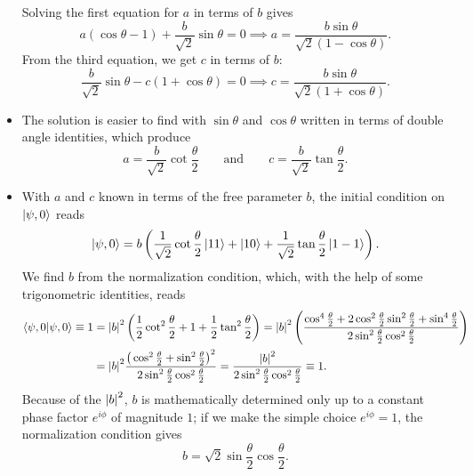 \documentclass[11pt, a4paper]{article}
\newcommand{\eqtext}[1]{\qquad \text{#1} \qquad}
\begin{document}
\begin{itemize}
	Solving the first equation for $ a $ in terms of $ b $ gives
	\begin{equation*}
		a(\cos \theta - 1) + \frac{b}{\sqrt{2}} \sin \theta = 0 \implies a = \frac{b\sin \theta}{\sqrt{2}(1 - \cos \theta)}.
	\end{equation*}
	From the third equation, we get $ c $ in terms of $ b $:
	\begin{equation*}
		\frac{b}{\sqrt{2}}\sin \theta - c(1 + \cos \theta) = 0 \implies c = \frac{b\sin \theta}{\sqrt{2}(1 + \cos \theta)}.
	\end{equation*}
	
	\item The solution is easier to find with $ \sin \theta  $ and $ \cos \theta $ written in terms of double angle identities, which produce
	\begin{equation*}
		 a = \frac{b}{\sqrt{2}
		 }\cot \frac{\theta}{2} \eqtext{and}  c = \frac{b}{\sqrt{2}}\tan \frac{\theta}{2}.
	\end{equation*}
	
	\item With $ a $ and $ c $ known in terms of the free parameter $ b $, the initial condition on $ \ket{\psi, 0} $ reads
	\begin{equation*}
		\ket{\psi, 0} = b\left(\frac{1}{\sqrt{2}}\cot \frac{\theta}{2}\ket{11} + \ket{10} + \frac{1}{\sqrt{2}}\tan \frac{\theta}{2}\ket{1-1}  \right).
	\end{equation*}
	We find $ b $ from the normalization condition, which, with the help of some trigonometric identities, reads
	\begin{align*}
		\braket{\psi, 0}{\psi, 0} \equiv 1 &= \abs{b}^{2}\left(\frac{1}{2}\cot^{2}\frac{\theta}{2} + 1 + \frac{1}{2}\tan^{2}\frac{\theta}{2} \right) = \abs{b}^{2}\left(\frac{\cos^{4}\frac{\theta}{2} + 2 \cos^{2}\frac{\theta}{2}\sin^{2}\frac{\theta}{2} + \sin^{4}\frac{\theta}{2}}{2\sin^{2}\frac{\theta}{2}\cos^{2}\frac{\theta}{2}}\right)\\
		&=\abs{b}^{2}\frac{\big(\cos^{2}\frac{\theta}{2} + \sin^{2}\frac{\theta}{2}\big)^{2}}{2 \sin^{2}\frac{\theta}{2} \cos^{2}\frac{\theta}{2}}  = \frac{\abs{b}^{2}}{2 \sin^{2}\frac{\theta}{2} \cos^{2}\frac{\theta}{2}} \equiv 1.
	\end{align*}
	Because of the $ \abs{b}^{2} $, $ b $ is mathematically determined only up to a constant phase factor $ e^{i\phi} $ of magnitude $ 1 $; if we make the simple choice $ e^{i\phi} = 1 $, the normalization condition gives
	\begin{equation*}
		b = \sqrt{2}\sin \frac{\theta}{2} \cos \frac{\theta}{2}.
	\end{equation*}
	

\end{itemize}
\end{document}
